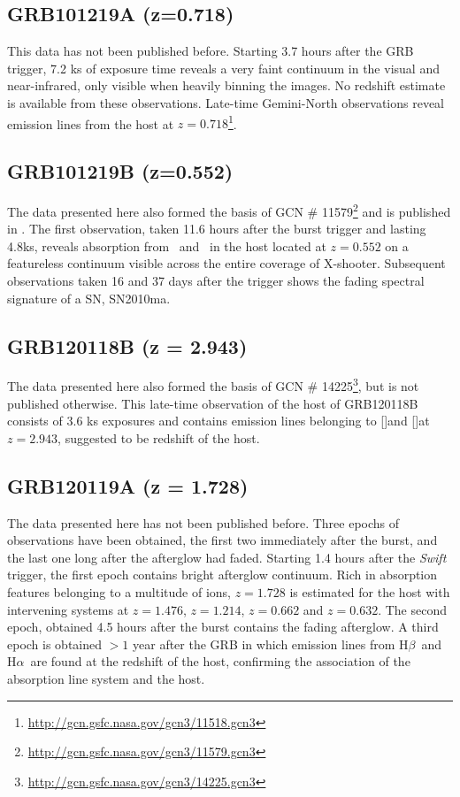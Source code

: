\documentclass[iop, twocolappendix, numberedappendix, tighten, appendixfloats]{emulateapj}
\newcommand{\hb}{H$\beta$}
\newcommand{\ha}{H$\alpha$}
\newcommand{\oii}{[\ion{O}{2}]}
\newcommand{\oiii}{[\ion{O}{3}]}
\newcommand{\mgi}{\ion{Mg}{1}}
\newcommand{\mgii}{\ion{Mg}{2}}
\begin{document}
	\subsection{GRB101219A (z=0.718)}
	This data has not been published before. Starting 3.7 hours after the GRB
	trigger, 7.2 ks of exposure time reveals a very faint continuum in the visual
	and near-infrared, only visible when heavily binning the images. No redshift
	estimate is available from these observations.  Late-time Gemini-North
	observations reveal emission lines from the host at
	$z=0.718$\footnote{\url{http://gcn.gsfc.nasa.gov/gcn3/11518.gcn3}}.

	\subsection{GRB101219B (z=0.552)}
	The data presented here also formed the basis of GCN \#
	11579\footnote{\url{http://gcn.gsfc.nasa.gov/gcn3/11579.gcn3}} and is published
	in \citet{Sparre2011}.	The first observation, taken 11.6 hours after the burst
	trigger and lasting 4.8ks, reveals absorption from \mgii~and \mgi~in the host
	located at $z = 0.552$ on a featureless continuum visible across the entire
	coverage of X-shooter.  Subsequent observations taken 16 and 37 days after the
	trigger shows the fading spectral signature of a SN, SN2010ma.

	\subsection{GRB120118B (z = 2.943)}
	The data presented here also formed the basis of GCN \#
	14225\footnote{\url{http://gcn.gsfc.nasa.gov/gcn3/14225.gcn3}}, but is not
	published otherwise. This late-time observation of the host of GRB120118B
	consists of 3.6 ks exposures and contains emission lines belonging to \oii and
	\oiii at $z =	2.943$, suggested to be redshift of the host.

	\subsection{GRB120119A (z = 1.728)}
	The data presented here has not been published before. Three epochs of
	observations have been obtained, the first two immediately after the burst, and
	the last one long after the afterglow had faded. Starting 1.4 hours after the
	\textit{Swift} trigger, the first epoch contains bright afterglow continuum.
	Rich in absorption features belonging to a multitude of ions, $z =	1.728$ is
	estimated for the host with intervening systems at $z =	1.476$, $z = 1.214$, $z
	= 0.662$ and $z = 0.632$. The second epoch, obtained 4.5 hours after the burst
	contains the fading afterglow. A third epoch is obtained $>1$ year after the
	GRB in which emission lines from \hb~and \ha~are found at the redshift of the
	host, confirming the association of the absorption line system and the host.
	
\end{document}
